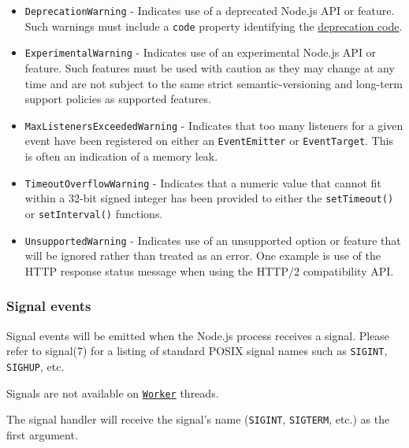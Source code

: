 \begin{itemize}
\tightlist
\item
  \texttt{\textquotesingle{}DeprecationWarning\textquotesingle{}} -
  Indicates use of a deprecated Node.js API or feature. Such warnings
  must include a \texttt{\textquotesingle{}code\textquotesingle{}}
  property identifying the \href{deprecations.md}{deprecation code}.
\item
  \texttt{\textquotesingle{}ExperimentalWarning\textquotesingle{}} -
  Indicates use of an experimental Node.js API or feature. Such features
  must be used with caution as they may change at any time and are not
  subject to the same strict semantic-versioning and long-term support
  policies as supported features.
\item
  \texttt{\textquotesingle{}MaxListenersExceededWarning\textquotesingle{}}
  - Indicates that too many listeners for a given event have been
  registered on either an \texttt{EventEmitter} or \texttt{EventTarget}.
  This is often an indication of a memory leak.
\item
  \texttt{\textquotesingle{}TimeoutOverflowWarning\textquotesingle{}} -
  Indicates that a numeric value that cannot fit within a 32-bit signed
  integer has been provided to either the \texttt{setTimeout()} or
  \texttt{setInterval()} functions.
\item
  \texttt{\textquotesingle{}UnsupportedWarning\textquotesingle{}} -
  Indicates use of an unsupported option or feature that will be ignored
  rather than treated as an error. One example is use of the HTTP
  response status message when using the HTTP/2 compatibility API.
\end{itemize}

\subsubsection{Signal events}\label{signal-events}

Signal events will be emitted when the Node.js process receives a
signal. Please refer to signal(7) for a listing of standard POSIX signal
names such as \texttt{\textquotesingle{}SIGINT\textquotesingle{}},
\texttt{\textquotesingle{}SIGHUP\textquotesingle{}}, etc.

Signals are not available on
\href{worker_threads.md\#class-worker}{\texttt{Worker}} threads.

The signal handler will receive the signal's name
(\texttt{\textquotesingle{}SIGINT\textquotesingle{}},
\texttt{\textquotesingle{}SIGTERM\textquotesingle{}}, etc.) as the first
argument.

